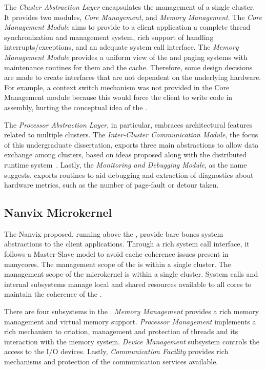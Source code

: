 		The \textit{Cluster Abstraction Layer} encapsulates the management of a single cluster.
		It provides two modules, \textit{Core Management}, and \textit{Memory Management}.
		The \textit{Core Management Module} aims to provide to a client application a complete
		thread synchronization and management system, rich support of handling
		interrupts/exceptions, and an adequate system call interface.
		The \textit{Memory Management Module} provides a uniform view of the \tlbs
		and paging systems with maintenance routines for them and the cache.
		Therefore, some design decisions are made to create interfaces that are not
		dependent on the underlying hardware.
		For example, a context switch mechanism was not provided in the
		Core Management module because this would force the client \os
		to write code in assembly, hurting the conceptual idea of the \hal.

		The \textit{Processor Abstraction Layer}, in particular, embraces
		architectural features related to multiple clusters.
		The \textit{Inter-Cluster Communication Module}, the focus of
		this undergraduate dissertation, exports three main abstractions
		to allow data exchange among clusters, based on ideas proposed
		along with the \nodeos distributed runtime system~\cite{DeDinechin2013-1}.
		Lastly, the \textit{Monitoring and Debugging Module}, as the
		name suggests, exports routines to aid debugging and extraction
		of diagnostics about hardware metrics, such as the number of
		page-fault or detour taken.

	\subsection{Nanvix Microkernel}
	\label{sec.microkernel}

		The Nanvix \microkernel proposed, running above the \hal, provide
		bare bones system abstractions to the client applications.
		Through a rich system call interface, it follows a Master-Slave \os model
		to avoid cache coherence issues present in manycores.
		The management scope of the \microkernel is within a single cluster.
		The management scope of the microkernel is within a single cluster.
		System calls and internal subsystems manage local and shared resources
		available to all cores to maintain the coherence of the \os.

		There are four subsystems in the \microkernel.
		\textit{Memory Management} provides a rich memory management and virtual
		memory support.
		\textit{Processor Management} implements a rich mechanism to criation,
		management and protection of threads and its interaction with the memory system.
		\textit{Device Management} subsystem controls the access to the I/O devices.
		Lastly, \textit{Communication Facility} provides rich mechanisms and protection of the
		communication services available.

